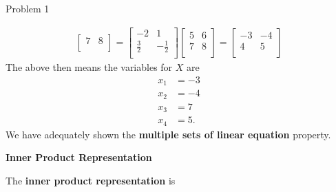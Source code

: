 \begin{problem}{Problem 1}
\begin{highlight}[Solution]
\begin{align*}
\begin{bmatrix}
                7 & 8 \\
            \end{bmatrix}
            = 
            \begin{bmatrix}
                -2 & 1 \\
                \frac{3}{2} & -\frac{1}{2} \\
            \end{bmatrix}
            \begin{bmatrix}
                5 & 6 \\
                7 & 8 \\
            \end{bmatrix}
            = 
            \begin{bmatrix}
                -3 & -4 \\
                4 & 5 \\
            \end{bmatrix}
        \end{align*}
        The above then means the variables for $X$ are 
        \begin{align*}
            x_{1} & = -3 \\
            x_{2} & = -4 \\
            x_{3} & = 7 \\
            x_{4} & = 5.
        \end{align*}
        We have adequately shown the \textbf{multiple sets of linear equation} property. \vspace*{1em}

        \noindent \textbf{Inner Product Representation} \vspace*{1em}

        The \textbf{inner product representation} is


\end{highlight}
\end{problem}
